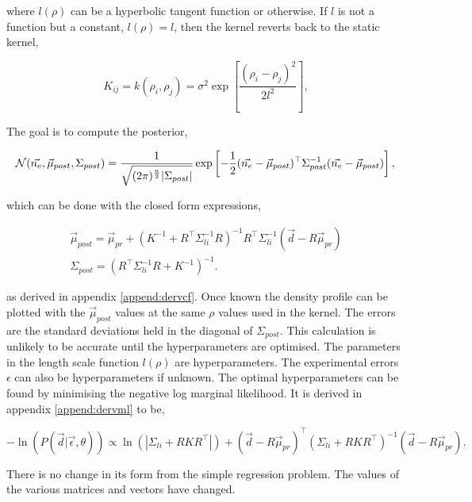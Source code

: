 \noindent where $l(\rho)$ can be a hyperbolic tangent function or otherwise. If $l$ is not a function but a constant, $l(\rho) = l$, then the kernel reverts back to the static kernel,

\begin{equation}
K_{ij} = k(\rho_i, \rho_j) = \sigma^2 \exp\left[{\frac{(\rho_i - \rho_j)^2}{2l^2}}\right],
\end{equation}
  
\noindent The goal is to compute the posterior,

\begin{equation}
\mathcal{N}(\vec{n_e}, \vec{\mu}_{post}, \Sigma_{post}) = \frac{1}{\sqrt{(2\pi)^{\frac{n}{2}}|\Sigma_{post}|}} \exp \left[{{-\frac{1}{2}(\vec{n_e}-\vec{\mu}_{post})^\top\Sigma_{post}^{-1}(\vec{n_e}-\vec{\mu}_{post})}}\right],\\
\end{equation}

\noindent which can be done with the closed form expressions,

\begin{gather}
    \vec{\mu}_{post}= \vec{\mu}_{pr} + (K^{-1} + R^{\top} \Sigma_{li}^{-1} R)^{-1} R^{\top} \Sigma_{li}^{-1} (\vec{d} - R \vec{\mu}_{pr})\\
    \Sigma_{post} = \left(R^\top \Sigma_{li}^{-1} R + K^{-1}\right)^{-1}.
\end{gather}

\noindent as derived in appendix \ref{append:dervcf}. Once known the density profile can be plotted with the $\vec{\mu}_{post}$ values at the same $\rho$ values used in the kernel. The errors are the standard deviations held in the diagonal of $\Sigma_{post}$. This calculation is unlikely to be accurate until the hyperparameters are optimised. The parameters in the length scale function $l(\rho)$ are hyperparameters. The experimental errors $\epsilon$ can also be hyperparameters if unknown. The optimal hyperparameters can be found by minimising the negative log marginal likelihood. It is derived in appendix \ref{append:dervml} to be, 

\begin{equation}
-\ln(P(\vec d| \vec \epsilon,\theta)) \propto \ln(|\Sigma_{li}+RKR^\top|) + (\vec{d} - R\vec{\mu}_{pr})^{\top} (\Sigma_{li} + R K R^{\top})^{-1} (\vec{d} - R\vec{\mu}_{pr}).
\end{equation}

\noindent There is no change in its form from the simple regression problem. The values of the various matrices and vectors have changed. 

